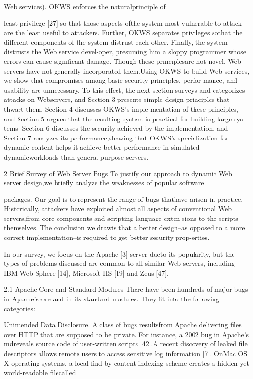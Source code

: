 Web services). OKWS enforces the naturalprinciple of

least privilege [27] so that those aspects ofthe system most vulnerable to attack are the least useful to attackers. Further, OKWS separates privileges sothat the different components of the system distrust each
other. Finally, the system distrusts the Web service devel-oper, presuming him a sloppy programmer whose errors
can cause significant damage. Though these principlesare not novel, Web servers have not generally incorporated them.Using OKWS to build Web services, we show that
compromises among basic security principles, perfor-mance, and usability are unnecessary. To this effect,
the next section surveys and categorizes attacks on Webservers, and Section 3 presents simple design principles
that thwart them. Section 4 discusses OKWS's imple-mentation of these principles, and Section 5 argues that
the resulting system is practical for building large sys-tems. Section 6 discusses the security achieved by the
implementation, and Section 7 analyzes its performance,showing that OKWS's specialization for dynamic content
helps it achieve better performance in simulated dynamicworkloads than general purpose servers.

2 Brief Survey of Web Server Bugs
To justify our approach to dynamic Web server design,we briefly analyze the weaknesses of popular software

packages. Our goal is to represent the range of bugs thathave arisen in practice. Historically, attackers have exploited almost all aspects of conventional Web servers,from core components and scripting language extensions to the scripts themselves. The conclusion we drawis that a better design--as opposed to a more correct
implementation--is required to get better security prop-erties.

In our survey, we focus on the Apache [3] server dueto its popularity, but the types of problems discussed are
common to all similar Web servers, including IBM Web-Sphere [14], Microsoft IIS [19] and Zeus [47].

2.1 Apache Core and Standard Modules
There have been hundreds of major bugs in Apache'score and in its standard modules. They fit into the following categories:

Unintended Data Disclosure. A class of bugs resultsfrom Apache delivering files over HTTP that are supposed to be private. For instance, a 2002 bug in Apache's
m\Gamma \Delta  \Delta d\Theta  reveals source code of user-written scripts [42].A recent discovery of leaked file descriptors allows remote users to access sensitive log information [7]. OnMac OS X operating systems, a local find-by-content indexing scheme creates a hidden yet world-readable filecalled

